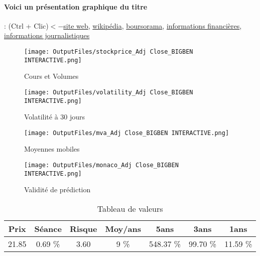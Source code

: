 \documentclass[11pt,a4paper]{report}%
\begin{document}
\paragraph{Voici un présentation graphique du titre} : (Ctrl + Clic)$<-$\href{https://bigben.fr/}{site web}, \href{https://fr.wikipedia.org/wiki/Bigben_Interactive}{wikipédia}, \href{https://www.boursorama.com/cours/1rPBIG}{boursorama}, \href{https://www.qwant.com/?q=site:https:%2f%2fwww.easybourse.com%2faction-societe%2fBIGBEN-INTERACTIVE&t=web&client=ext-firefox-hp}{informations financières}, \href{https://bourse.lerevenu.com/cours-de-bourse/fiche-valeur-synthese/BIGBEN-INTERACTIVE/BIG-FR}{informations journalistiques}
\begin{figure}[!htb]
   \begin{minipage}{0.5\textwidth}
     \centering
     \texttt{[image: OutputFiles/stockprice\_Adj Close\_BIGBEN INTERACTIVE.png]}
     \caption{Cours et Volumes}\label{Fig:price_BIGBEN INTERACTIVE}
   \end{minipage}\hfill
   \begin{minipage}{0.5\textwidth}
     \centering
     \texttt{[image: OutputFiles/volatility\_Adj Close\_BIGBEN INTERACTIVE.png]}
     \caption{Volatilité à 30 jours}\label{Fig:volat_BIGBEN INTERACTIVE}
   \end{minipage}
\end{figure}
\begin{figure}[!htb]
   \begin{minipage}{0.5\textwidth}
     \centering
     \texttt{[image: OutputFiles/mva\_Adj Close\_BIGBEN INTERACTIVE.png]}
     \caption{Moyennes mobiles}\label{Fig:mva_BIGBEN INTERACTIVE}
   \end{minipage}\hfill
   \begin{minipage}{0.5\textwidth}
     \centering
     \texttt{[image: OutputFiles/monaco\_Adj Close\_BIGBEN INTERACTIVE.png]}
     \caption{Validité de prédiction}\label{Fig:prediction_BIGBEN INTERACTIVE}
   \end{minipage}
\end{figure}

\begin{table}[H]
  \centering
    \begin{tabular}{|c|c|c|c|c|c|c|}
    \hline
    Prix & Séance & Risque  & Moy/ans & 5ans & 3ans & 1ans \\
    \hline
    21.85 &    0.69 \%    & 3.60 & 9 \% & 548.37 \% & 99.70 \% & 11.59 \% \\
    \hline
    \end{tabular}%
        \label{tab:table_BIGBEN INTERACTIVE}%
      \caption{Tableau de valeurs}
\end{table}%
\end{document}
